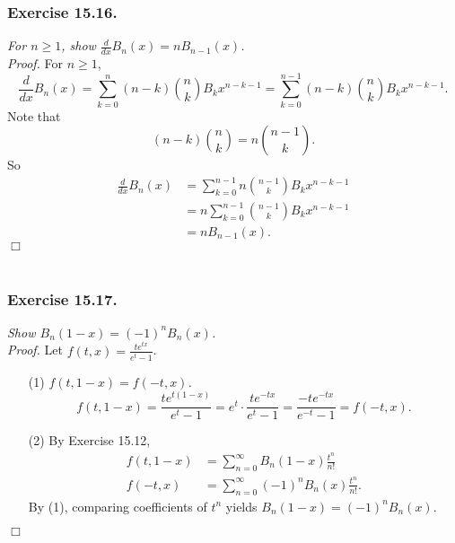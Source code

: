 \documentclass{article}
\begin{document}



\subsubsection*{Exercise 15.16.}
\emph{For $n \geq 1$, show $\frac{d}{dx}B_n(x) = nB_{n-1}(x)$.} \\

\emph{Proof.}
For $n \geq 1$,
$$\frac{d}{dx}B_n(x)
= \sum_{k=0}^{n}(n - k) {n \choose k} B_k x^{n - k - 1}
= \sum_{k=0}^{n-1}(n - k) {n \choose k} B_k x^{n - k - 1}.$$
Note that
$$(n-k) {n \choose k} = n {n-1 \choose k}.$$
So
\begin{align*}
\frac{d}{dx}B_n(x)
&= \sum_{k=0}^{n-1} n {n-1 \choose k} B_k x^{n - k - 1} \\
&= n \sum_{k=0}^{n-1} {n-1 \choose k} B_k x^{n - k - 1} \\
&= n B_{n-1}(x).
\end{align*}
$\Box$ \\\\






\subsubsection*{Exercise 15.17.}
\emph{Show $B_n(1-x) = (-1)^n B_n(x)$.} \\

\emph{Proof.}
Let $f(t, x) = \frac{te^{tx}}{e^t - 1}$.
\begin{enumerate}
\item[(1)]
\emph{$f(t, 1-x) = f(-t, x)$.}
$$f(t, 1-x)
= \frac{te^{t(1-x)}}{e^t - 1}
= e^t \cdot \frac{te^{-tx}}{e^t - 1}
= \frac{-te^{-tx}}{e^{-t} - 1} = f(-t, x).$$
\item[(2)]
By Exercise 15.12,
\begin{align*}
f(t, 1-x)
&= \sum_{n=0}^{\infty} B_n(1-x) \frac{t^n}{n!} \\
f(-t, x)
&= \sum_{n=0}^{\infty} (-1)^n B_n(x) \frac{t^n}{n!}.
\end{align*}
By (1), comparing coefficients of $t^n$ yields
$B_n(1-x) = (-1)^n B_n(x)$.
\end{enumerate}
$\Box$ \\\\
\end{document}

